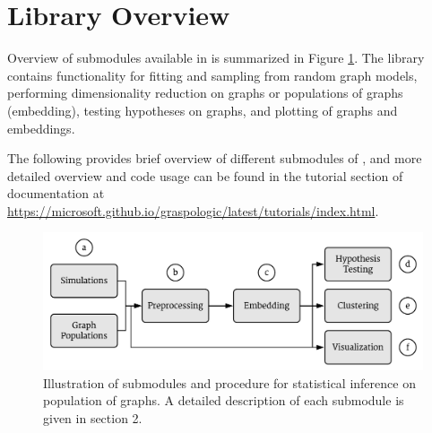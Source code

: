 \section{Library Overview}
Overview of submodules available in \graspy is summarized in Figure \ref{fig:graspy}. The library contains functionality for fitting and sampling from random graph models, performing dimensionality reduction on graphs or populations of graphs (embedding), testing hypotheses on graphs, and plotting of graphs and embeddings.

The following provides brief overview of different submodules of \graspy, and more detailed overview and code usage can be found in the tutorial section of \graspy documentation at \url{https://microsoft.github.io/graspologic/latest/tutorials/index.html}.

\begin{figure}[t]
    \centering
    \includegraphics[width=.8\linewidth]{figures/graspy/graspy.pdf}
    \caption{Illustration of submodules and procedure for statistical inference on population of graphs. A detailed description of each submodule is given in section 2.}
    \label{fig:graspy}
\end{figure}


